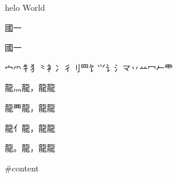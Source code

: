 \begin{grandindex}

\prFsizeMm

helo World \prCenter{ }

{\jzrFontSunflowerXA 國}{\jzrFontSunflowerXA 一}

{\jzrFontSunflowerXA 國}{\jzrFontSunflowerXA 一}





宀爫牜犭⺀衤冫彳刂罒饣⺍讠氵龴丷䒑冖𠂉⻗

龍灬龍，龍龍

龍覀龍，龍龍

龍亻龍，龍龍

龍。龍，龍龍



#{content}

\end{grandindex}



